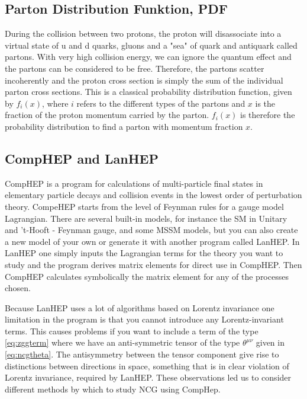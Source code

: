 \subsection{Parton Distribution Funktion, PDF}
During the collision between two protons, the proton will disassociate into a virtual state of u and d quarks, gluons and a "sea" of quark and antiquark called partons. With very high collision energy, we can ignore the quantum effect and the partons can be considered to be free. Therefore, the partons scatter incoherently and the proton cross section is simply the sum of the individual parton cross sections. This is a classical probability distribution function, given by $f_{i}(x)$, where $i$ refers to the different types of the partons and $x$ is the fraction of the proton momentum carried by the parton\cite{green2005hpp}. $f_{i}(x)$ is therefore the probability distribution to find a parton with momentum fraction $x$.

\subsection{CompHEP and LanHEP}

CompHEP is a program for calculations of multi-particle final states in elementary particle decays and collision events in the lowest order of perturbation theory. CompeHEP starts from the level of Feynman rules for a gauge model Lagrangian. There are several built-in models, for instance the SM in Unitary and 't-Hooft - Feynman gauge, and some MSSM models, but you can also create a new model of your own or generate it with another program called LanHEP. In LanHEP one simply inputs the Lagrangian terms for the theory you want to study and the program derives matrix elements for direct use in CompHEP.  Then CompHEP calculates symbolically the matrix element for any of the processes chosen.

Because LanHEP uses a lot of algorithms based on Lorentz invariance one limitation in the program is that you cannot introduce any Lorentz-invariant terms. This causes problems if you want to include a term of the type \eqref{eq:zggterm} where we have an anti-symmetric tensor of the type $\theta^{\mu\nu}$ given in \eqref{eq:ncgtheta}. The antisymmetry between the tensor component give rise to distinctions between directions in space, something that is in clear violation of Lorentz invariance, required by LanHEP. These observations led us to consider different methods by which to study NCG using CompHep.

